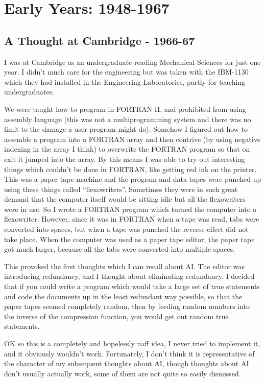 
\chapter{Early Years: 1948-1967}

\section{A Thought at Cambridge - 1966-67}

I was at Cambridge as an undergraduate reading Mechanical Sciences for just one year.
I didn't much care for the engineering but was taken with the IBM-1130 which they had installed in the Engineering Laboratories, partly for teaching undergraduates.

We were taught how to program in FORTRAN II, and prohibited from using assembly language (this was not a multiprogramming system and there was no limit to the damage a user program might do).
Somehow I figured out how to assemble a program into a FORTRAN array and then contrive (by using negative indexing in the array I think) to overwrite the FORTRAN program so that on exit it jumped into the array.
By this means I was able to try out interesting things which couldn't be done in FORTRAN, like getting red ink on the printer.
This was a paper tape machine and the program and data tapes were punched up using these things called ``flexowriters''.
Sometimes they were in such great demand that the computer itself would be sitting idle but all the flexowriters were in use.
So I wrote a FORTRAN program which turned the computer into a flexowriter.
However, since it was in FORTRAN when a tape was read, tabs were converted into spaces, but when a tape was punched the reverse effect did not take place.
When the computer was used as a paper tape editor, the paper tape got much larger, because all the tabs were converted into multiple spaces.

This provoked the first thoughts which I can recall about AI.
The editor was introducing redundancy, and I thought about eliminating redundancy.
I decided that if you could write a program which would take a large set of true statements and code the documents up in the least redundant way possible, so that the paper tapes seemed completely random, then by feeding random numbers into the inverse of the compression function, you would get out random true statements.

OK so this is a completely and hopelessly naff idea, I never tried to implement it, and it obviously wouldn't work.
Fortunately, I don't think it is representative of the character of my subsequent thoughts about AI, though thoughts about AI don't usually actually work, some of them are not quite so easily dismissed.

